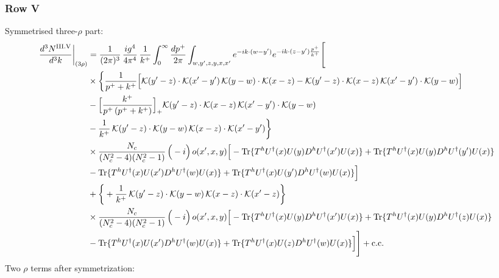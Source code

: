 \documentclass[9pt]{article}
\numberwithin{equation}{section}
\begin{document}
\subsubsection*{Row V}
Symmetrised three-$\rho$ part:
\begin{align}
\frac{d^{3}N^{\rm III.V}}{d^{3}k}\bigg|_{(3\rho)} &=\frac{1}{(2\pi)^{3}}\,\frac{ig^{4}}{4\pi^{4}}\,\frac{1}{k^{+}}\int_{0}^{\infty}\frac{dp^{+}}{2\pi}\int_{w,y',z,y,x,x'}e^{-ik\cdot(w-y')}e^{-ik\cdot(z-y')\frac{p^{+}}{k^{+}}}\Bigg[\notag\\
&\times\bigg\{\frac{1}{p^{+}+k^{+}}\Big[\mathcal{K}(y'-z)\cdot\mathcal{K}(x'-y')\,\mathcal{K}(y-w)\cdot\mathcal{K}(x-z)-\mathcal{K}(y'-z)\cdot\mathcal{K}(x-z)\,\mathcal{K}(x'-y')\cdot\mathcal{K}(y-w)\Big]\notag\\
&-\Big[\frac{k^{+}}{p^{+}\,(p^{+}+k^{+})}\Big]_{+}\mathcal{K}(y'-z)\cdot\mathcal{K}(x-z)\,\mathcal{K}(x'-y')\cdot\mathcal{K}(y-w)\notag\\
&-\frac{1}{k^{+}}\,\mathcal{K}(y'-z)\cdot\mathcal{K}(y-w)\,\mathcal{K}(x-z)\cdot\mathcal{K}(x'-y')\bigg\}\notag\\
&\times \frac{N_{c}}{(N_{c}^{2}-4)(N_{c}^{2}-1)}\,\Big(-i\Big)\,o(x',x,y)\Big[-{\rm Tr}\{T^{h}U^{\dagger}(x)U(y)D^{h}U^{\dagger}(x')U(x)\}+{\rm Tr}\{T^{h}U^{\dagger}(x)U(y)D^{h}U^{\dagger}(y')U(x)\}\notag\\
& -{\rm Tr}\{T^{h}U^{\dagger}(x)U(x')D^{h}U^{\dagger}(w)U(x)\}+{\rm Tr}\{T^{h}U^{\dagger}(x)U(y')D^{h}U^{\dagger}(w)U(x)\}\Big]\notag\\
&+\bigg\{+\frac{1}{k^{+}}\,\mathcal{K}(y'-z)\cdot\mathcal{K}(y-w)\,\mathcal{K}(x-z)\cdot\mathcal{K}(x'-z)\bigg\}\notag\\
&\times \frac{N_{c}}{(N_{c}^{2}-4)(N_{c}^{2}-1)}\,\Big(-i\Big)\,o(x',x,y)\Big[-{\rm Tr}\{T^{h}U^{\dagger}(x)U(y)D^{h}U^{\dagger}(x')U(x)\}+{\rm Tr}\{T^{h}U^{\dagger}(x)U(y)D^{h}U^{\dagger}(z)U(x)\}\notag\\
& -{\rm Tr}\{T^{h}U^{\dagger}(x)U(x')D^{h}U^{\dagger}(w)U(x)\}+{\rm Tr}\{T^{h}U^{\dagger}(x)U(z)D^{h}U^{\dagger}(w)U(x)\}\Big]\Bigg]+{\rm c.c.}\label{eq:E-III.V-3}
\end{align}
Two $\rho$ terms after symmetrization: 
\end{document}
